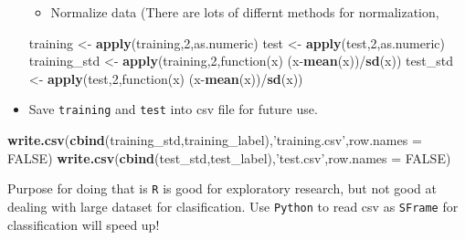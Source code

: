 \documentclass[]{article}
\newenvironment{Shaded}{\begin{snugshade}}{\end{snugshade}}
\newcommand{\KeywordTok}[1]{\textcolor[rgb]{0.13,0.29,0.53}{\textbf{{#1}}}}
\newcommand{\DataTypeTok}[1]{\textcolor[rgb]{0.13,0.29,0.53}{{#1}}}
\newcommand{\DecValTok}[1]{\textcolor[rgb]{0.00,0.00,0.81}{{#1}}}
\newcommand{\StringTok}[1]{\textcolor[rgb]{0.31,0.60,0.02}{{#1}}}
\newcommand{\OtherTok}[1]{\textcolor[rgb]{0.56,0.35,0.01}{{#1}}}
\newcommand{\NormalTok}[1]{{#1}}
\begin{document}
\begin{itemize}
  \begin{itemize}
  \itemsep1pt\parskip0pt
  \item
    Normalize data (There are lots of differnt methods for
    normalization,
  \end{itemize}

\begin{Shaded}
\begin{Highlighting}[]
\NormalTok{training <-}\StringTok{ }\KeywordTok{apply}\NormalTok{(training,}\DecValTok{2}\NormalTok{,as.numeric)}
\NormalTok{test <-}\StringTok{ }\KeywordTok{apply}\NormalTok{(test,}\DecValTok{2}\NormalTok{,as.numeric)}
\NormalTok{training_std <-}\StringTok{ }\KeywordTok{apply}\NormalTok{(training,}\DecValTok{2}\NormalTok{,function(x) (x-}\KeywordTok{mean}\NormalTok{(x))/}\KeywordTok{sd}\NormalTok{(x))}
\NormalTok{test_std <-}\StringTok{ }\KeywordTok{apply}\NormalTok{(test,}\DecValTok{2}\NormalTok{,function(x) (x-}\KeywordTok{mean}\NormalTok{(x))/}\KeywordTok{sd}\NormalTok{(x))}
\end{Highlighting}
\end{Shaded}
\item
  Save \texttt{training} and \texttt{test} into csv file for future use.
\end{itemize}

\begin{Shaded}
\begin{Highlighting}[]
\KeywordTok{write.csv}\NormalTok{(}\KeywordTok{cbind}\NormalTok{(training_std,training_label),}\StringTok{'training.csv'}\NormalTok{,}\DataTypeTok{row.names =} \OtherTok{FALSE}\NormalTok{)}
\KeywordTok{write.csv}\NormalTok{(}\KeywordTok{cbind}\NormalTok{(test_std,test_label),}\StringTok{'test.csv'}\NormalTok{,}\DataTypeTok{row.names =} \OtherTok{FALSE}\NormalTok{)}
\end{Highlighting}
\end{Shaded}

Purpose for doing that is \texttt{R} is good for exploratory research,
but not good at dealing with large dataset for clasification. Use
\texttt{Python} to read csv as \texttt{SFrame} for classification will
speed up!
\end{document}
